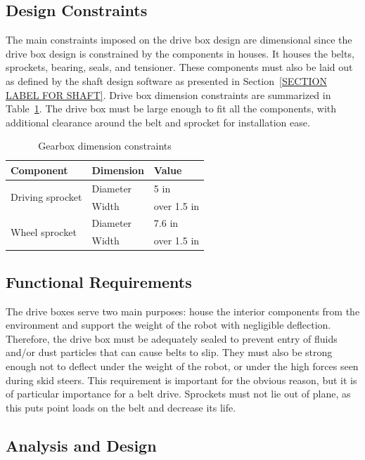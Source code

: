 \subsection{Design Constraints}

The main constraints imposed on the drive box design are dimensional since the drive box design is constrained by the components in houses. It houses the belts, sprockets, bearing, seals, and tensioner. These components must also be laid out as defined by the shaft design software as presented in Section~\ref{SECTION LABEL FOR SHAFT}. %
Drive box dimension constraints are summarized in Table~\ref{tab:box_dim}. The drive box must be large enough to fit all the components, with additional clearance around the belt and sprocket for installation ease.

\begin{table}[htbp]
\centering
\caption{Gearbox dimension constraints}
\begin{tabular}{| lll |}\hline
Component & Dimension & Value \\ \hline
\multirow{2}{*}{Driving sprocket} & Diameter & 5  in \\
& Width & over 1.5 in \\
\multirow{2}{*}{Wheel sprocket} & Diameter & 7.6  in \\
& Width & over 1.5 in \\ \hline
\end{tabular}
\label{tab:box_dim}
\end{table}

\subsection{Functional Requirements}

The drive boxes serve two main purposes: house the interior components from the environment and support the weight of the robot with negligible deflection. Therefore, the drive box must be adequately sealed to prevent entry of fluids and/or dust particles that can cause belts to slip. They must also be strong enough not to deflect under the weight of the robot, or under the high forces seen during skid steers. This requirement is important for the obvious reason, but it is of particular importance for a belt drive. Sprockets must not lie out of plane, as this puts point loads on the belt and decrease its life.

\subsection{Analysis and Design}
